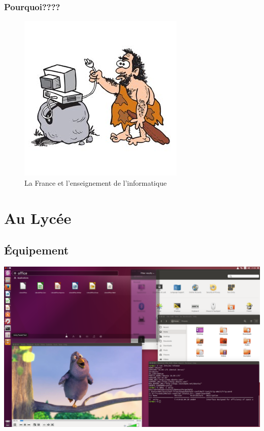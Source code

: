 \documentclass[french,handout]{beamer}
\begin{document}
\begin{frame}\frametitle{Pourquoi????}


  \begin{figure}
\centering
\includegraphics{caveman.jpg}
\caption{La France et l'enseignement de l'informatique}
\end{figure}
  
\end{frame}


\section{Au Lycée}

\subsection{Équipement}


\begin{frame}
  
\begin{center}
  \includegraphics[width=\linewidth]{ubuntu}
\end{center}

\end{frame}
\end{document}
